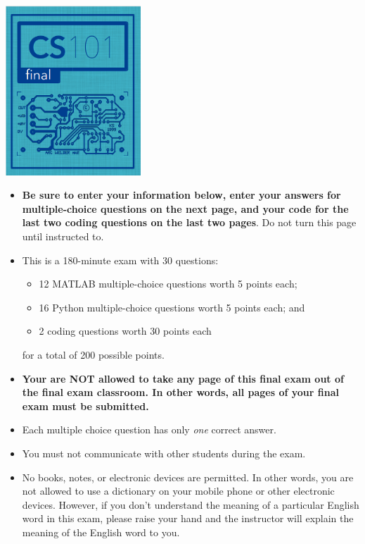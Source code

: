 \documentclass{article}
\newcounter{question}
\begin{document}
\begin{center}
%
\includegraphics[width=2in]{../img/final-header.png}
\end{center}

\bigskip
\noindent
\begin{itemize}
\item  \textbf{Be sure to enter your information below, enter your answers for multiple-choice questions on the next page, and your code for the last two coding questions on the last two pages}.  Do not turn this page until instructed to.
\item  This is a 180-minute exam with 30 questions:
  \begin{itemize}
  \item  12 MATLAB multiple-choice questions worth 5 points each;
  \item  16 Python multiple-choice questions worth 5 points each; and
  \item  2 coding questions worth 30 points each
  \end{itemize}
  for a total of 200 possible points.
  
\item  \textbf{Your are NOT allowed to take any page of this final exam out of the final exam classroom. In other words, all pages of your final exam must be submitted.}  
\item  Each multiple choice question has only \emph{one} correct answer.
\item  You must not communicate with other students during the exam.
\item No books, notes, or electronic devices are permitted. In other words, you are not allowed to use a dictionary on your mobile phone or other electronic devices. However, if you don't understand the meaning of a particular English word in this exam, please raise your hand and the instructor will explain the meaning of the English word to you. 
\end{itemize}
\end{document}
